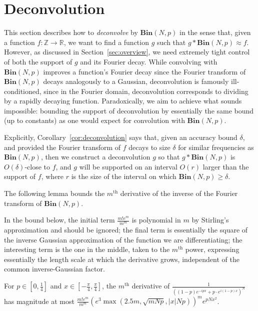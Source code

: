 \documentclass[11pt]{article}
\theoremstyle{plain}
\newcommand{\Bin}[2]{\textbf{Bin}(#1,#2)}
\begin{document}
\section{Deconvolution}\label{sec:deconvolution}
This section describes how to \emph{deconvolve} by $\Bin{N}{p}$ in the sense that, given a function $f:\mathbb{Z}\rightarrow \mathbb{R}$, we want to find a function $g$ such that $g\ast \Bin{N}{p}\approx f$. However, as discussed in Section~\ref{sec:overview}, we need extremely tight control of both the support of $g$ and its Fourier decay. While convolving with $\Bin{N}{p}$ improves a function's Fourier decay since the Fourier transform of $\Bin{N}{p}$ decays analogously to a Gaussian, deconvolution is famously ill-conditioned, since in the Fourier domain, deconvolution corresponds to dividing by a rapidly decaying function. Paradoxically, we aim to achieve what sounds impossible: bounding the support of deconvolution by essentially the same bound (up to constants) as one would expect for convolution with $\Bin{N}{p}$.

Explicitly, Corollary~\ref{cor:deconvolution} says that, given an accuracy bound $\delta$, and provided the Fourier transform of $f$ decays to size $\delta$ for similar frequencies as $\Bin{N}{p}$, then we construct a deconvolution $g$ so that $g\ast \Bin{N}{p}$ is $O(\delta)$-close to $f$, and $g$ will be supported on an interval $O(r)$ larger than the support of $f$, where $r$ is the size of the interval on which $\Bin{N}{p}\geq \delta$.








The following lemma bounds the $m^\textrm{th}$ derivative of the inverse of the Fourier transform of $\Bin{N}{p}$.

In the bound below, the initial term $\frac{m!e^m}{m^m}$ is polynomial in $m$ by Stirling's approximation and should be ignored; the final term is essentially the square of the inverse Gaussian approximation of the function we are differentiating; the interesting term is the one in the middle, taken to the $m^\textrm{th}$ power, expressing essentially the length scale at which the derivative grows, independent of the common inverse-Gaussian factor.

\begin{lemma}\label{lem:inverse-derivative}
For $p\in [0,\frac{1}{4}]$ and $x\in [-\frac{\pi}{4},\frac{\pi}{4}]$, the $m^{\textrm{th}}$ derivative of $\frac{1}{((1-p)e^{-i p x}+p\cdot e^{i (1-p)x})^N}$ has magnitude at most $\frac{m!e^m}{m^m}(e^3\max(2.5 m,\sqrt{mNp},|x|Np))^{m}e^{pNx^2}$.
\end{lemma}
\end{document}
